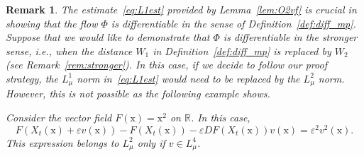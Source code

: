 \documentclass[sn-mathphys-num]{sn-jnl}
\numberwithin{equation}{section}
\theoremstyle{mythm}
\theoremstyle{mydef}
\newtheorem{remark}[proposition]{Remark}
\begin{document}
\begin{remark}\label{rem:problem}
  The estimate~\eqref{eq:L1est} provided by Lemma~\ref{lem:O2vf} is crucial in showing that the flow \( \Phi \) is differentiable in the sense of Definition~\ref{def:diff_mp}. Suppose that we would like to demonstrate that \( \Phi \) is differentiable in the stronger sense, i.e., when the distance \( W_1 \) in Definition~\ref{def:diff_mp} is replaced by \( W_2 \) (see Remark~\ref{rem:stronger}). In this case, if we decide to follow our proof strategy, the \( L^1_{\mu} \) norm in~\eqref{eq:L1est} would need to be replaced by the \( L^2_{\mu} \) norm. However, this is not possible as the following example shows.

  Consider the vector field $F(\mathrm{x})=\mathrm{x}^2$ on $\mathbb R$. In this case,
    \[
      F(X_t(\mathrm{x})+\varepsilon v(\mathrm{x})) - F(X_t(\mathrm{x})) - \varepsilon DF(X_t(\mathrm{x}))v(\mathrm{x}) = \varepsilon^2 v^2(\mathrm{x}).
    \]
    This expression belongs to $L^2_\mu$ only if \( v\in L^4_{\mu} \).
\end{remark}
\end{document}
